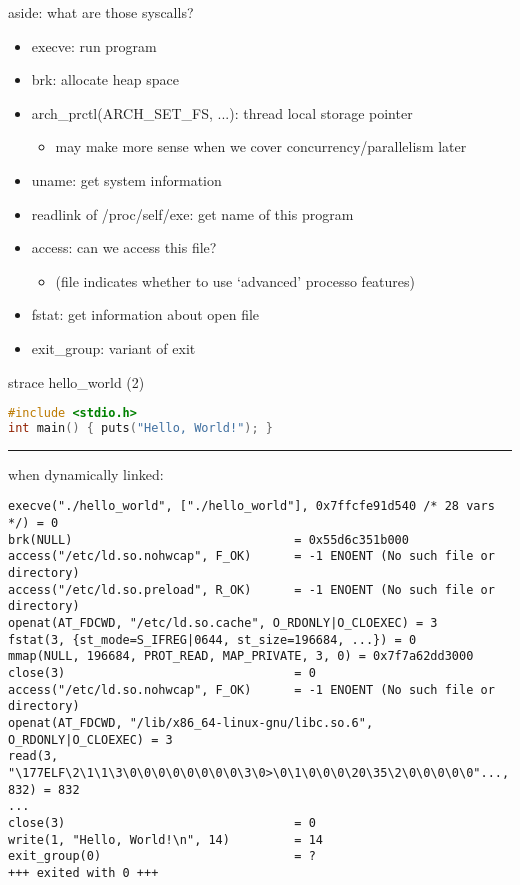 \begin{frame}{aside: what are those syscalls?}
\begin{itemize}
\item execve: run program
\item brk: allocate heap space
\item arch\_prctl(ARCH\_SET\_FS, ...): thread local storage pointer
    \begin{itemize}
    \item may make more sense when we cover concurrency/parallelism later
    \end{itemize}
\item uname: get system information
\item readlink of /proc/self/exe: get name of this program
\item access: can we access this file?
    \begin{itemize}
    \item (file indicates whether to use `advanced' processo features)
    \end{itemize}
\item fstat: get information about open file
\item exit\_group: variant of exit
\end{itemize}
\end{frame}

\begin{frame}[fragile]{strace hello\_world (2)}
\begin{lstlisting}[language=C]
#include <stdio.h>
int main() { puts("Hello, World!"); }
\end{lstlisting}
\hrule
when dynamically linked:
\begin{Verbatim}[fontsize=\scriptsize]
execve("./hello_world", ["./hello_world"], 0x7ffcfe91d540 /* 28 vars */) = 0
brk(NULL)                               = 0x55d6c351b000
access("/etc/ld.so.nohwcap", F_OK)      = -1 ENOENT (No such file or directory)
access("/etc/ld.so.preload", R_OK)      = -1 ENOENT (No such file or directory)
openat(AT_FDCWD, "/etc/ld.so.cache", O_RDONLY|O_CLOEXEC) = 3
fstat(3, {st_mode=S_IFREG|0644, st_size=196684, ...}) = 0
mmap(NULL, 196684, PROT_READ, MAP_PRIVATE, 3, 0) = 0x7f7a62dd3000
close(3)                                = 0
access("/etc/ld.so.nohwcap", F_OK)      = -1 ENOENT (No such file or directory)
openat(AT_FDCWD, "/lib/x86_64-linux-gnu/libc.so.6", O_RDONLY|O_CLOEXEC) = 3
read(3, "\177ELF\2\1\1\3\0\0\0\0\0\0\0\0\3\0>\0\1\0\0\0\20\35\2\0\0\0\0\0"..., 832) = 832
...
close(3)                                = 0
write(1, "Hello, World!\n", 14)         = 14
exit_group(0)                           = ?
+++ exited with 0 +++
\end{Verbatim}
\end{frame}
